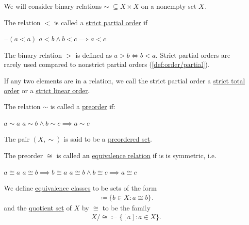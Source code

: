 \begin{definition}\label{def:orders}
  We will consider binary relations $\sim\; \subseteq X \times X$ on a nonempty set $X$.

  \begin{defenum}
    \item\label{def:order/strict_partial} The relation $<$ is called a \ul{strict partial order} if
    \begin{description}
       $\lnot(a < a)$
       $a < b \land b < c \implies a < c$
    \end{description}

    The binary relation $>$ is defined as $a > b \iff b < a$. Strict partial orders are rarely used compared to nonstrict partial orders (\cref{def:order/partial}).

    If any two elements are in a relation, we call the strict partial order a \ul{strict total order} or a \ul{strict linear order}.

    \item\label{def:order/preorder} The relation $\sim$ is called a \ul{preorder} if:
    \begin{description}
       $a \sim a$
       $a \sim b \land b \sim c \implies a \sim c$
    \end{description}

    The pair $(X, \sim)$ is said to be a \ul{preordered set}.

    \item\label{def:order/equivalence} The preorder $\cong$ is called an \ul{equivalence relation} if is is symmetric, i.e.
    \begin{description}
       $a \cong a$
       $a \cong b \implies b \cong a$
       $a \cong b \land b \cong c \implies a \cong c$
    \end{description}

    We define \ul{equivalence classes} to be sets of the form
    \begin{align*}
      [a] \coloneqq \{ b \in X \colon a \cong b \}.
    \end{align*}
    and the \ul{quotient set} of $X$ by $\cong$ to be the family
    \begin{align*}
      X / \cong \coloneqq \{ [a] \colon a \in X \}.
    \end{align*}


\end{defenum}
\end{definition}
